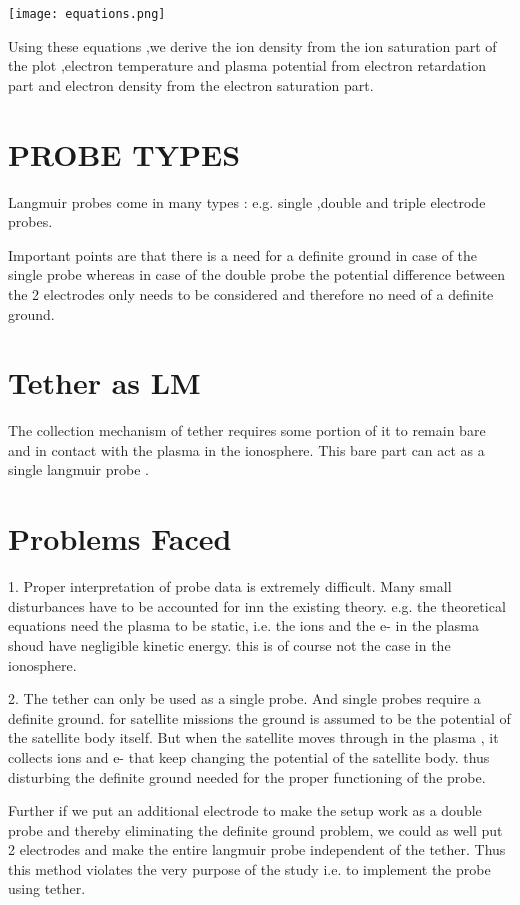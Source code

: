 \documentclass[12pt, a4paper, oneside]{book}
\begin{document}
\texttt{[image: equations.png]}



Using these equations ,we derive the ion density from the ion saturation part of the plot ,electron temperature and plasma potential from electron retardation part and electron density from the electron saturation part. 

	

	
	\section{PROBE TYPES}
	Langmuir probes come in many types :
	e.g. single ,double and triple electrode probes.
	
	Important points are that there is a need for a definite ground in case of the single probe whereas in case  of the double probe the potential difference between the 2 electrodes only needs to be considered and therefore no need of a definite ground.
	
	
	\section{Tether as LM}
	The collection mechanism of tether requires some portion of it to remain bare and in contact with the plasma in the ionosphere. This bare part can act as a single langmuir probe . 
	\section{Problems Faced}
	1. Proper interpretation of probe data is extremely difficult. 
	Many small disturbances have to be accounted for inn the existing theory. e.g. the theoretical equations need the plasma to be static, i.e. the ions and the e- in the plasma shoud have negligible kinetic energy. this is of course not the case in the ionosphere.
	
	2. The tether can only be used as a single probe. And single probes require a definite ground. for satellite missions the ground is assumed to be the potential of the satellite body itself. But when the satellite moves through in the plasma , it collects ions and e- that keep changing the potential of the satellite body. thus disturbing the definite ground needed for the proper functioning of the probe.
	
	Further if we put an additional electrode to make the setup work as a double probe and thereby eliminating the definite ground problem, we could as well put 2 electrodes and make the entire langmuir probe independent of the tether. Thus this method violates the very purpose of the study i.e. to implement the probe using tether.
	
\end{document}
